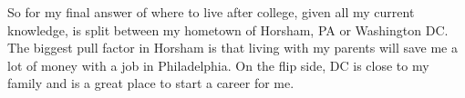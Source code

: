 \documentclass{article}
\begin{document}
So for my final answer of where to live after college, given all my current knowledge, is split between my hometown of Horsham, PA or Washington DC. The biggest pull factor in Horsham is that living with my parents will save me a lot of money with a job in Philadelphia. On the flip side, DC is close to my family and is a great place to start a career for me. 
\end{document}

